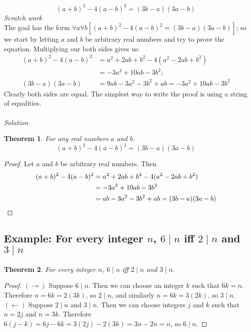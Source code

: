 \documentclass{report}
\newtheorem*{theorem}{Theorem}
\theoremstyle{definition}
\begin{document}
\begin{equation*}
(a+b)^2-4(a-b)^2=(3b-a)(3a-b)
\end{equation*}
\textit{Scratch work}\\
The goal has the form $\forall a\forall b[(a+b)^2-4(a-b)^2=(3b-a)(3a-b)]$; so we start by letting $a$ and $b$ be arbitrary real numbers
and try to prove the equation. Multiplying our both sides gives us:
\begin{align*}
(a+b)^2-4(a-b)^2&=a^2+2ab+b^2-4(a^2-2ab+b^2)\\
&=-3a^2+10ab-3b^2;\\
(3b-a)(3a-b)&=9ab-3a^2-3b^2+ab=-3a^2+10ab-3b^2
\end{align*}
Clearly both sides are equal. The simplest way to write the proof is using a string of equalities.\\
\vspace{1mm}\\
\textit{Solution}
\begin{theorem}
For any real numbers $a$ and $b$.
\begin{equation*}
(a+b)^2-4(a-b)^2=(3b-a)(3a-b)
\end{equation*}
\end{theorem}
\begin{proof}
Let $a$ and $b$ be arbitrary real numbers. Then 
\begin{align*}
(a+b)^2-4(a-b)^2&=a^2+2ab+b^2-4(a^2-2ab+b^2)\\
&=-3a^2+10ab-3b^2\\
&=ab-3a^2-3b^2+ab=(3b-a)(3a-b)\qedhere
\end{align*}
\end{proof}
\newpage

\subsection{Example: For every integer $n$, $6\mid n$ iff $2\mid n$ and $3\mid n$}
\begin{theorem}
For every integer $n$, $6\mid n$ iff $2\mid n$ and $3\mid n$.
\end{theorem}
\begin{proof}
$(\rightarrow)$ Suppose $6\mid n$. Then we can choose an integer $k$ such that $6k=n$. Therefore $n=6k=2(3k)$, so $2\mid n$, and
similarly $n=6k=3(2k)$, so $3\mid n$.\\
\indent$(\leftarrow)$ Suppose $2\mid n$ and $3\mid n$. Then we can choose integers $j$ and $k$ such that $n=2j$ and $n=3k$.
Therefore $6(j-k)=6j-6k=3(2j)-2(3k)=3n-2n=n$, so $6\mid n$.
\end{proof}
\newpage
\end{document}
